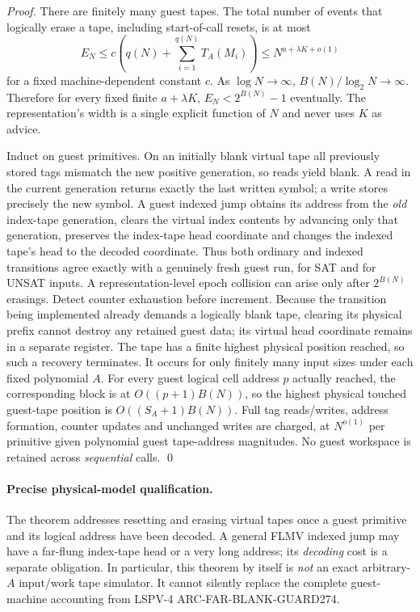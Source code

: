 \documentclass[11pt]{article}
\begin{document}
\begin{proof}
There are finitely many guest tapes. The total number of events that logically erase a tape, including start-of-call resets, is at most
\[
E_N\le c\left(q(N)+\sum_{i=1}^{q(N)} T_A(M_i)\right)
       \le N^{a+\lambda K+o(1)}
\]
for a fixed machine-dependent constant $c$. As $\log N\to\infty$,
$B(N)/\log_2 N\to\infty$. Therefore for every fixed finite $a+\lambda K$,
$E_N<2^{B(N)}-1$ eventually. The representation's width is a single explicit function of $N$ and never uses $K$ as advice.

Induct on guest primitives. On an initially blank virtual tape all previously stored tags mismatch the new positive generation, so reads yield blank. A read in the current generation returns exactly the last written symbol; a write stores precisely the new symbol. A guest indexed jump obtains its address from the \emph{old} index-tape generation, clears the virtual index contents by advancing only that generation, preserves the index-tape head coordinate and changes the indexed tape's head to the decoded coordinate. Thus both ordinary and indexed transitions agree exactly with a genuinely fresh guest run, for SAT and for UNSAT inputs. A representation-level epoch collision can arise only after $2^{B(N)}$ erasings. Detect counter exhaustion before increment. Because the transition being implemented already demands a logically blank tape, clearing its physical prefix cannot destroy any retained guest data; its virtual head coordinate remains in a separate register. The tape has a finite highest physical position reached, so such a recovery terminates. It occurs for only finitely many input sizes under each fixed polynomial $A$. For every guest logical cell address $p$ actually reached, the corresponding block is at $O((p+1)B(N))$, so the highest physical touched guest-tape position is $O((S_A+1)B(N))$. Full tag reads/writes, address formation, counter updates and unchanged writes are charged, at $N^{o(1)}$ per primitive given polynomial guest tape-address magnitudes. No guest workspace is retained across \emph{sequential} calls. \qed
\end{proof}

\paragraph{Precise physical-model qualification.}
The theorem addresses resetting and erasing virtual tapes once a guest primitive and its logical address have been decoded. A general FLMV indexed jump may have a far-flung index-tape head or a very long address; its \emph{decoding} cost is a separate obligation. In particular, this theorem by itself is \emph{not} an exact arbitrary-$A$ input/work tape simulator. It cannot silently replace the complete guest-machine accounting from LSPV-4 ARC-FAR-BLANK-GUARD274.
\end{document}
